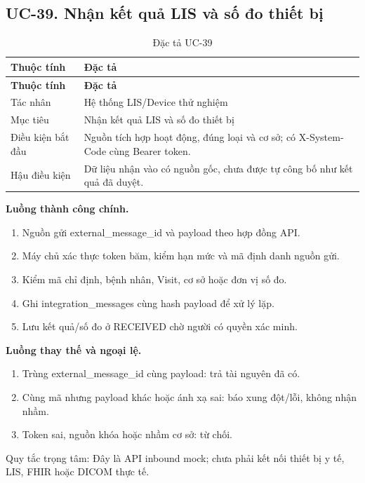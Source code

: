\clearpage

\subsection{UC-39.\allowbreak{} Nhận kết quả LIS và số đo thiết bị}
\label{uc:39}

{\small\setlength{\tabcolsep}{3pt}\renewcommand{\arraystretch}{1.12}
\begin{longtable}{@{}L{\textwidth-1.32pt\relax} L{\textwidth-4.68pt\relax}@{}}
\caption{Đặc tả UC-39}\\
\toprule
\textbf{Thuộc tính} & \textbf{Đặc tả}\\\midrule
\endfirsthead
\toprule
\textbf{Thuộc tính} & \textbf{Đặc tả}\\\midrule
\endhead
\bottomrule\endlastfoot
Tác nhân & Hệ thống LIS/\allowbreak{}Device thử nghiệm\\[3pt]
Mục tiêu & Nhận kết quả LIS và số đo thiết bị\\[3pt]
Điều kiện bắt đầu & Nguồn tích hợp hoạt động, đúng loại và cơ sở; có X-System-Code cùng Bearer token.\allowbreak{}\\[3pt]
Hậu điều kiện & Dữ liệu nhận vào có nguồn gốc, chưa được tự công bố như kết quả đã duyệt.\allowbreak{}\\[3pt]
\end{longtable}}
\noindent\textbf{Luồng thành công chính.}
\begin{enumerate}
\item Nguồn gửi external\_\allowbreak{}message\_\allowbreak{}id và payload theo hợp đồng API.\allowbreak{}
\item Máy chủ xác thực token băm, kiểm hạn mức và mã định danh nguồn gửi.\allowbreak{}
\item Kiểm mã chỉ định, bệnh nhân, Visit, cơ sở hoặc đơn vị số đo.\allowbreak{}
\item Ghi integration\_\allowbreak{}messages cùng hash payload để xử lý lặp.\allowbreak{}
\item Lưu kết quả/\allowbreak{}số đo ở RECEIVED chờ người có quyền xác minh.\allowbreak{}
\end{enumerate}
\noindent\textbf{Luồng thay thế và ngoại lệ.}
\begin{enumerate}
\item Trùng external\_\allowbreak{}message\_\allowbreak{}id cùng payload:\allowbreak{} trả tài nguyên đã có.\allowbreak{}
\item Cùng mã nhưng payload khác hoặc ánh xạ sai:\allowbreak{} báo xung đột/\allowbreak{}lỗi, không nhận nhầm.\allowbreak{}
\item Token sai, nguồn khóa hoặc nhầm cơ sở:\allowbreak{} từ chối.\allowbreak{}
\end{enumerate}
Quy tắc trọng tâm:\allowbreak{} Đây là API inbound mock; chưa phải kết nối thiết bị y tế, LIS, FHIR hoặc DICOM thực tế.\allowbreak{}

